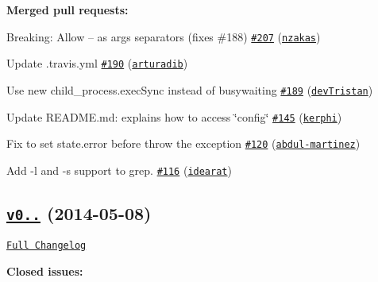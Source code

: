 {\bfseries Merged pull requests\+:}


\begin{DoxyItemize}
\item Breaking\+: Allow -- as args separators (fixes \#188) \href{https://github.com/shelljs/shelljs/pull/207}{\tt \#207} (\href{https://github.com/nzakas}{\tt nzakas})
\item Update .travis.\+yml \href{https://github.com/shelljs/shelljs/pull/190}{\tt \#190} (\href{https://github.com/arturadib}{\tt arturadib})
\item Use new child\+\_\+process.\+exec\+Sync instead of busywaiting \href{https://github.com/shelljs/shelljs/pull/189}{\tt \#189} (\href{https://github.com/devTristan}{\tt dev\+Tristan})
\item Update R\+E\+A\+D\+M\+E.\+md\+: explains how to access \char`\"{}config\char`\"{} \href{https://github.com/shelljs/shelljs/pull/145}{\tt \#145} (\href{https://github.com/kerphi}{\tt kerphi})
\item Fix to set state.\+error before throw the exception \href{https://github.com/shelljs/shelljs/pull/120}{\tt \#120} (\href{https://github.com/abdul-martinez}{\tt abdul-\/martinez})
\item Add -\/l and -\/s support to grep. \href{https://github.com/shelljs/shelljs/pull/116}{\tt \#116} (\href{https://github.com/idearat}{\tt idearat})
\end{DoxyItemize}

\subsection*{\href{https://github.com/shelljs/shelljs/tree/v0.3.0}{\tt v0..} (2014-\/05-\/08)}

\href{https://github.com/shelljs/shelljs/compare/v0.2.6...v0.3.0}{\tt Full Changelog}

{\bfseries Closed issues\+:}


